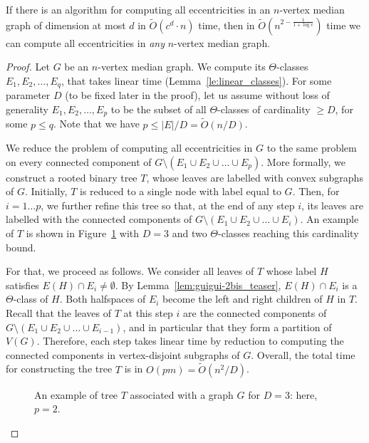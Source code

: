 \documentclass[a4paper,UKenglish,numberwithinsect,cleveref, autoref]{lipics-v2021}
\newcommand{\card}[1]{\left| #1 \right|}
\begin{document}
\begin{lemma}\label{lem:guigui-4}
If there is an algorithm for computing all eccentricities in an $n$-vertex median graph of dimension at most $d$ in $\tilde{O}(c^d \cdot n)$ time, then in $\tilde{O}(n^{2 - \frac 1 {1+\log{c}}})$ time we can compute all eccentricities in {\em any} $n$-vertex median graph.
\end{lemma}
\begin{proof}
Let $G$ be an $n$-vertex median graph.
We compute its $\Theta$-classes $E_1,E_2,\ldots,E_q$, that takes linear time (Lemma~\ref{le:linear_classes}).
For some parameter $D$ (to be fixed later in the proof), let us assume without loss of generality $E_1,E_2,\ldots,E_p$ to be the subset of all $\Theta$-classes of cardinality $\geq D$, for some $p \leq q$. Note that we have $p \leq \card{E}/D = \tilde{O}(n/D)$.

We reduce the problem of computing all eccentricities in $G$ to the same problem on every connected component of $G \setminus (E_1 \cup E_2 \cup \ldots \cup E_p)$. 
More formally, we construct a rooted binary tree $T$, whose leaves are labelled with convex subgraphs of $G$.
Initially, $T$ is reduced to a single node with label equal to $G$.
Then, for $i = 1 \ldots p$, we further refine this tree so that, at the end of any step $i$, its leaves are labelled with the connected components of $G \setminus \left(E_1 \cup E_2 \cup \ldots \cup E_i\right)$. An example of $T$ is shown in Figure~\ref{fig:reduction} with $D=3$ and two $\Theta$-classes reaching this cardinality bound.

For that, we proceed as follows.
We consider all leaves of $T$ whose label $H$ satisfies $E(H) \cap E_i \neq \emptyset$.
By Lemma~\ref{lem:guigui-2bis_teaser}, $E(H) \cap E_i$ is a $\Theta$-class of $H$.
Both halfspaces of $E_i$ become the left and right children of $H$ in $T$. 
Recall that the leaves of $T$ at this step $i$ are the connected components of $G \setminus (E_1 \cup E_2 \cup \ldots \cup E_{i-1})$, and in particular that they form a partition of $V(G)$.
Therefore, each step takes linear time by reduction to computing the connected components in vertex-disjoint subgraphs of $G$.
Overall, the total time for constructing the tree $T$ is in ${O}(pm) = \tilde{O}(n^2/D)$.

\begin{figure}[h]
\centering
\scalebox{0.6}{}
\caption{An example of tree $T$ associated with a graph $G$ for $D=3$: here, $p=2$.}
\label{fig:reduction}
\end{figure}


\end{proof}
\end{document}
